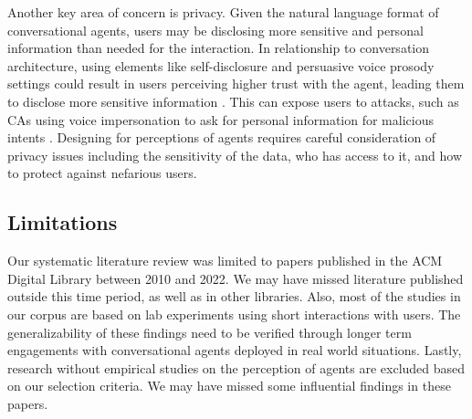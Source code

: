 Another key area of concern is privacy. Given the natural language format of conversational agents, users may be disclosing more sensitive and personal information than needed for the interaction. In relationship to conversation architecture, using elements like self-disclosure and persuasive voice prosody settings could result in users perceiving higher trust with the agent, leading them to disclose more sensitive information  \cite{dubiel2020persuasive, lee2020hear}\cmt{[60][23]}. This can expose users to attacks, such as CAs using voice impersonation to ask for personal information for malicious intents \cite{chan2021kinvoices}\cmt{[74]}. Designing for perceptions of agents requires careful consideration of privacy issues including the sensitivity of the data, who has access to it, and how to protect against nefarious users.

\subsection{Limitations}

Our systematic literature review was limited to papers published in the ACM Digital Library between 2010 and 2022. We may have missed literature published outside this time period, as well as in other libraries. Also, most of the studies in our corpus are based on lab experiments using short interactions with users. The generalizability of these findings need to be verified through longer term engagements with conversational agents deployed in real world situations. Lastly, research without empirical studies on the perception of agents are excluded based on our selection criteria. We may have missed some influential findings in these papers. %